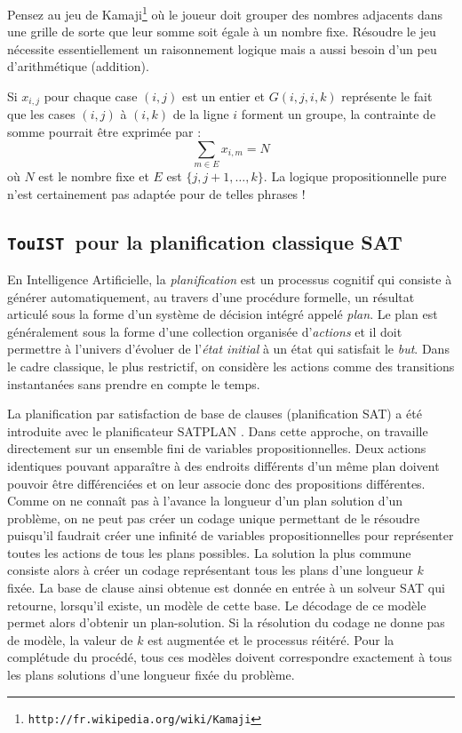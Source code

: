 \documentclass{iaf}
\newcommand{\nameTool}{{\sc \texttt {TouIST}}}
\begin{document}
Pensez au jeu de Kamaji\footnote{\texttt{http://fr.wikipedia.org/wiki/Kamaji}}  o\`u le joueur doit grouper des nombres adjacents dans une grille de sorte que leur somme soit \'egale \`a un nombre fixe. R\'esoudre le jeu n\'ecessite essentiellement un raisonnement logique mais a aussi besoin d'un peu d'arithm\'etique (addition).


Si $x_{i,j}$ pour chaque case $(i,j)$ est un entier et $G(i,j,i,k)$ repr\'esente le fait que les cases $(i,j)$ \`a $(i,k)$ de la ligne $i$ forment un groupe, la contrainte de somme pourrait \^etre exprim\'ee par :
$$\sum_{m\in E}x_{i,m}=N$$
o\`u $N$ est le nombre fixe et $E$ est $\{j,j+1,\ldots,k\}$. La logique propositionnelle pure n'est certainement pas adapt\'ee pour de telles phrases !




\subsection{\nameTool\ pour la planification classique SAT}

En Intelligence Artificielle, la \emph{planification} est un processus cognitif qui consiste \`a g\'en\'erer automatiquement, au travers d'une proc\'edure formelle, un r\'esultat articul\'e sous la forme d'un syst\`eme de d\'ecision int\'egr\'e appel\'e \emph{plan}. Le plan est g\'en\'eralement sous la forme d'une collection organis\'ee d'\emph{actions} et il doit permettre \`a l'univers d'\'evoluer de l'\emph{\'etat initial} \`a un \'etat qui satisfait le \emph{but}. Dans le cadre classique, le plus restrictif, on consid\`{e}re les actions comme des transitions instantan\'{e}es sans prendre en compte le temps.

La planification par satisfaction de base de clauses (planification SAT) a \'et\'e introduite avec le planificateur SATPLAN \cite{kautzS92_planning_sat}. Dans cette approche, on travaille directement sur un ensemble fini de variables propositionnelles. Deux actions identiques pouvant appara\^{i}tre \`a des endroits diff\'erents d'un m\^{e}me plan doivent pouvoir \^{e}tre diff\'{e}renci\'{e}es et on leur associe donc des propositions diff\'erentes. Comme on ne conna\^{i}t pas \`a l'avance la longueur d'un plan solution d'un probl\`eme, on ne peut pas cr\'eer un codage unique permettant de le r\'esoudre puisqu'il faudrait cr\'eer une infinit\'e de variables propositionnelles pour repr\'esenter toutes les actions de tous les plans possibles. La solution la plus commune consiste alors \`a cr\'eer un codage repr\'esentant tous les plans d'une longueur $k$ fix\'ee. La base de clause ainsi obtenue est donn\'ee en entr\'ee \`a un solveur SAT qui retourne, lorsqu'il existe, un mod\`ele de cette base. Le d\'ecodage de ce mod\`ele permet alors d'obtenir un plan-solution. Si la r\'esolution du codage ne donne pas de mod\`ele, la valeur de $k$ est augment\'ee et le processus r\'eit\'er\'e. Pour la compl\'etude du proc\'ed\'e, tous ces mod\`eles doivent correspondre exactement \`a tous les plans solutions d'une longueur fix\'ee du probl\`eme.
\end{document}

